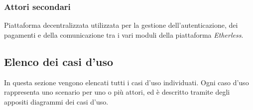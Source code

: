 	\subsubsection{Attori secondari}
		\begin{description}[style=nextline]
			\item[\textbf{Ethereum network}]
				Piattaforma decentralizzata utilizzata per la gestione dell'autenticazione, dei pagamenti e della comunicazione tra i vari moduli della piattaforma \textit{Etherless}. 
		\end{description}
	\pagebreak
\subsection{Elenco dei casi d'uso}
In questa sezione vengono elencati tutti i casi d'uso individuati. Ogni caso d'uso rappresenta uno scenario per uno o più attori, ed è descritto tramite degli appositi diagrammi dei casi d'uso. 










































